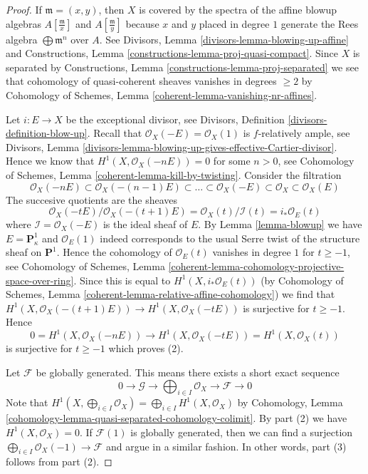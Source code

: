\begin{proof}
If $\mathfrak m = (x, y)$, then $X$ is covered by the spectra
of the affine blowup algebras $A[\frac{\mathfrak m}{x}]$ and
$A[\frac{\mathfrak m}{y}]$ because $x$ and $y$ placed in degree $1$
generate the Rees algebra $\bigoplus \mathfrak m^n$ over $A$.
See Divisors, Lemma \ref{divisors-lemma-blowing-up-affine} and
Constructions, Lemma \ref{constructions-lemma-proj-quasi-compact}.
Since $X$ is separated by
Constructions, Lemma \ref{constructions-lemma-proj-separated}
we see that cohomology of quasi-coherent sheaves vanishes in
degrees $\geq 2$ by Cohomology of Schemes, Lemma
\ref{coherent-lemma-vanishing-nr-affines}.

\medskip\noindent
Let $i : E \to X$ be the exceptional divisor, see
Divisors, Definition \ref{divisors-definition-blow-up}.
Recall that $\mathcal{O}_X(-E) = \mathcal{O}_X(1)$ is
$f$-relatively ample, see
Divisors, Lemma \ref{divisors-lemma-blowing-up-gives-effective-Cartier-divisor}.
Hence we know that $H^1(X, \mathcal{O}_X(-nE)) = 0$ for some $n > 0$,
see Cohomology of Schemes, Lemma \ref{coherent-lemma-kill-by-twisting}.
Consider the filtration
$$
\mathcal{O}_X(-nE) \subset \mathcal{O}_X(-(n - 1)E) \subset
\ldots \subset \mathcal{O}_X(-E) \subset \mathcal{O}_X \subset \mathcal{O}_X(E)
$$
The succesive quotients are the sheaves
$$
\mathcal{O}_X(-t E)/\mathcal{O}_X(-(t + 1)E) =
\mathcal{O}_X(t)/\mathcal{I}(t) =
i_*\mathcal{O}_E(t)
$$
where $\mathcal{I} = \mathcal{O}_X(-E)$ is the ideal sheaf of $E$.
By Lemma \ref{lemma-blowup} we have $E = \mathbf{P}^1_\kappa$ and
$\mathcal{O}_E(1)$ indeed corresponds to the usual Serre twist of
the structure sheaf on $\mathbf{P}^1$. Hence the cohomology
of $\mathcal{O}_E(t)$ vanishes in degree $1$ for $t \geq -1$, see
Cohomology of Schemes, Lemma
\ref{coherent-lemma-cohomology-projective-space-over-ring}.
Since this is equal to $H^1(X, i_*\mathcal{O}_E(t))$ (by
Cohomology of Schemes, Lemma \ref{coherent-lemma-relative-affine-cohomology})
we find that $H^1(X, \mathcal{O}_X(-(t + 1)E)) \to H^1(X, \mathcal{O}_X(-tE))$
is surjective for $t \geq -1$. Hence
$$
0 = H^1(X, \mathcal{O}_X(-nE))
\longrightarrow
H^1(X, \mathcal{O}_X(-tE)) = H^1(X, \mathcal{O}_X(t))
$$
is surjective for $t \geq -1$ which proves (2).

\medskip\noindent
Let $\mathcal{F}$ be globally generated. This means there exists
a short exact sequence
$$
0 \to \mathcal{G} \to \bigoplus\nolimits_{i \in I} \mathcal{O}_X
\to \mathcal{F} \to 0
$$
Note that $H^1(X, \bigoplus_{i \in I} \mathcal{O}_X) =
\bigoplus_{i \in I} H^1(X, \mathcal{O}_X)$ by
Cohomology, Lemma \ref{cohomology-lemma-quasi-separated-cohomology-colimit}.
By part (2) we have $H^1(X, \mathcal{O}_X) = 0$.
If $\mathcal{F}(1)$ is globally generated, then we can find a
surjection $\bigoplus_{i \in I} \mathcal{O}_X(-1) \to \mathcal{F}$
and argue in a similar fashion.
In other words, part (3) follows from part (2).


\end{proof}
